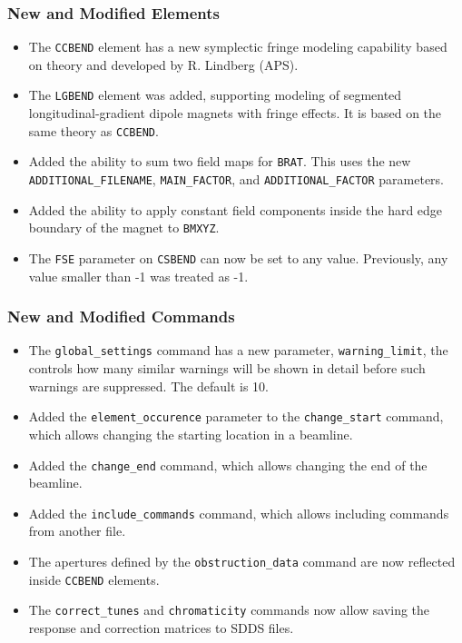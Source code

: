 \documentclass[11pt]{article}
\begin{document}
\subsubsection{New and Modified Elements}
\begin{itemize}
\item The \verb|CCBEND| element has a new symplectic fringe modeling capability based on theory and developed
  by R. Lindberg (APS).
\item The \verb|LGBEND| element was added, supporting modeling of segmented longitudinal-gradient dipole magnets with
  fringe effects. It is based on the same theory as \verb|CCBEND|.
\item Added the ability to sum two field maps for \verb|BRAT|. This uses the new \verb|ADDITIONAL_FILENAME|, 
  \verb|MAIN_FACTOR|, and \verb|ADDITIONAL_FACTOR| parameters.
\item Added the ability to apply constant field components inside the hard edge boundary of the magnet
  to \verb|BMXYZ|.
\item The \verb|FSE| parameter on \verb|CSBEND| can now be set to any value. Previously, any value smaller than
  -1 was treated as -1.   
\end{itemize}

\subsubsection{New and Modified Commands}
\begin{itemize}
\item The \verb|global_settings| command has a new parameter, \verb|warning_limit|, the controls how many similar
  warnings will be shown in detail before such warnings are suppressed. The default is 10.
\item Added the \verb|element_occurence| parameter to the \verb|change_start| command, which allows
  changing the starting location in a beamline.
\item Added the \verb|change_end| command, which allows changing the end of the beamline.
\item Added the \verb|include_commands| command, which allows including commands from another file.
\item The apertures defined by the \verb|obstruction_data| command are now reflected inside \verb|CCBEND| elements.
\item The \verb|correct_tunes| and \verb|chromaticity| commands now allow saving the response and correction
  matrices to SDDS files.
\end{itemize}
\end{document}
